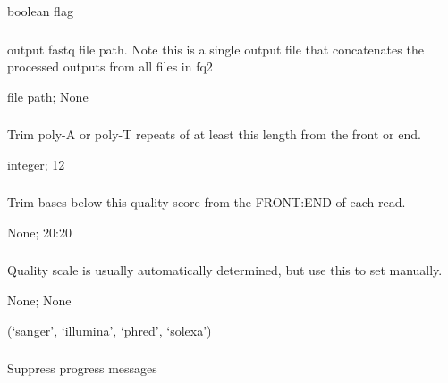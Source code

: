 \documentclass[letterpaper,11pt,english]{sphinxmanual}
\begin{document}
 boolean flag


\subsubsection{}
\label{\detokenize{prog_desc:out2}}
 output fastq file path. Note this is a single output file that concatenates the processed outputs from all files in \textendash{}fq2

 file path;  None


\subsubsection{}
\label{\detokenize{prog_desc:p-trim-poly}}
 Trim poly-A or poly-T repeats of at least this length from the front or end.

 integer;  12


\subsubsection{}
\label{\detokenize{prog_desc:q-trim-qual}}
 Trim bases below this quality score from the FRONT:END of each read.

 None;  20:20


\subsubsection{}
\label{\detokenize{prog_desc:quality-scale}}
 Quality scale is usually automatically determined, but use this to set manually.

 None;  None

 (‘sanger’, ‘illumina’, ‘phred’, ‘solexa’)


\subsubsection{}
\label{\detokenize{prog_desc:id6}}
 Suppress progress messages
\end{document}
